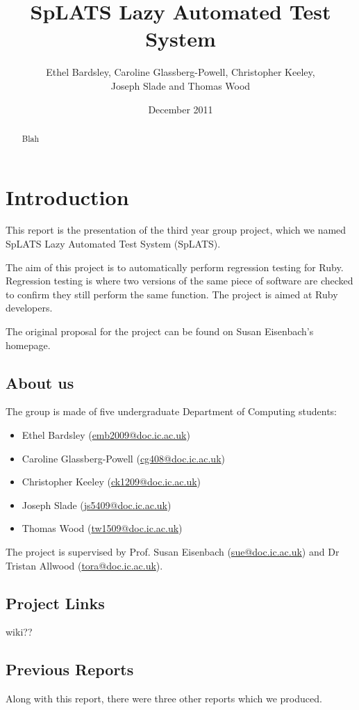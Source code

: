 \documentclass{report}
\makeatletter
\newcommand{\mail}[1]{\href{mailto:#1@doc.ic.ac.uk}{#1@doc.ic.ac.uk}}
\makeatother
\begin{document}
\title{SpLATS Lazy Automated Test System}
\author{Ethel Bardsley, Caroline Glassberg-Powell, Christopher Keeley,\\ Joseph Slade and Thomas Wood}
\date{December 2011}
\maketitle

\begin{abstract}
Blah
\end{abstract}

\chapter{Introduction}
This report is the presentation of the third year group project, which we named SpLATS Lazy Automated Test System (SpLATS).

The aim of this project is to automatically perform regression testing for Ruby. Regression testing is where two versions of the same piece of software are checked to confirm they still perform the same function. The project is aimed at Ruby developers.

The original proposal for the project can be found on Susan Eisenbach's homepage.

\section{About us}
The group is made of five undergraduate Department of Computing students:
\begin{itemize}
\item{Ethel Bardsley (\mail{emb2009})}
\item{Caroline Glassberg-Powell (\mail{cg408})}
\item{Christopher Keeley (\mail{ck1209})}
\item{Joseph Slade (\mail{js5409})}
\item{Thomas Wood (\mail{tw1509})}
\end{itemize}

The project is supervised by Prof. Susan Eisenbach (\mail{sue}) and Dr Tristan Allwood (\mail{tora}).

\section{Project Links}
wiki??

\section{Previous Reports}
Along with this report, there were three other reports which we produced.
\end{document}

